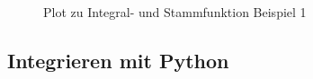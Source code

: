\documentclass{fhnwreport} %
\begin{document}
\begin{figure}[!h]
\caption{Plot zu Integral- und Stammfunktion Beispiel 1}
\end{figure}

\subsection{Integrieren mit Python}


\clearpage


\end{document}
